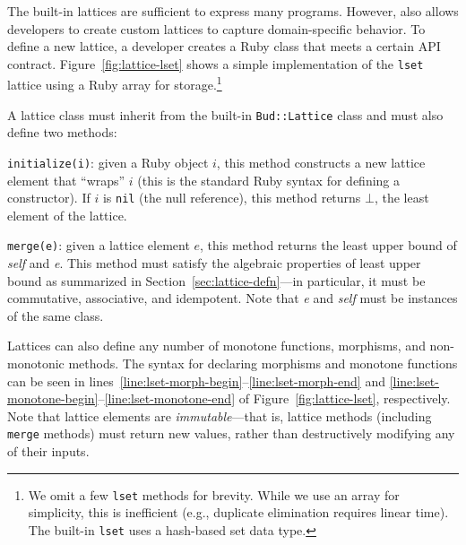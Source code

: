 \label{sec:lattice-api}
The built-in lattices are sufficient to express many programs. However, \lang
also allows developers to create custom lattices to capture domain-specific
behavior. To define a new lattice, a developer creates a Ruby class that meets a
certain API contract. Figure~\ref{fig:lattice-lset} shows a simple
implementation of the \texttt{lset} lattice using a Ruby array for
storage.\footnote{We omit a few \texttt{lset} methods for brevity. While we use
  an array for simplicity, this is inefficient (e.g., duplicate elimination
  requires linear time). The built-in \texttt{lset} uses a hash-based set data
  type.}

A lattice class must inherit from the built-in \texttt{Bud::Lattice} class and
must also define two methods:
\begin{compactitem}
\item \texttt{initialize(i)}: given a Ruby object $i$, this method constructs a
  new lattice element that ``wraps'' $i$ (this is the standard Ruby syntax for
  defining a constructor). If $i$ is \texttt{nil} (the null reference), this
  method returns $\bot$, the least element of the lattice.

\item \texttt{merge(e)}: given a lattice element $e$, this method returns the
  least upper bound of \emph{self} and \emph{e}. This method must satisfy the
  algebraic properties of least upper bound as summarized in
  Section~\ref{sec:lattice-defn}---in particular, it must be commutative,
  associative, and idempotent. Note that \emph{e} and \emph{self} must be
  instances of the same class.
\end{compactitem}
Lattices can also define any number of monotone functions, morphisms, and
non-monotonic methods. The syntax for declaring morphisms and monotone functions
can be seen in lines~\ref{line:lset-morph-begin}--\ref{line:lset-morph-end} and
\ref{line:lset-monotone-begin}--\ref{line:lset-monotone-end} of
Figure~\ref{fig:lattice-lset}, respectively. Note that lattice elements are
\emph{immutable}---that is, lattice methods (including \texttt{merge} methods)
must return new values, rather than destructively modifying any of their inputs.



